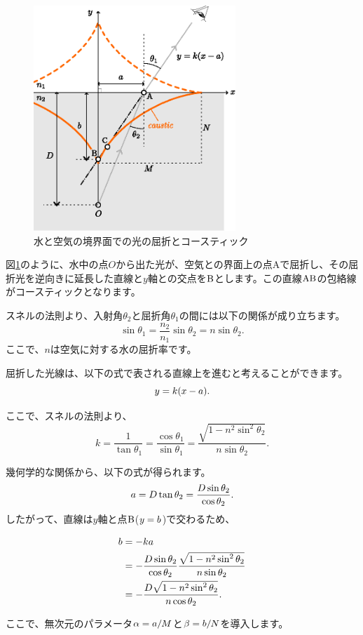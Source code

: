 \documentclass[twocolumn]{article}
\begin{document}
	\begin{figure}[ht]
		\centering
		\includegraphics[width=3in]{figs/g237.eps}
		\caption{水と空気の境界面での光の屈折とコースティック}
		\label{fig:geometry}
	\end{figure}
	
	図\ref{fig:geometry}のように、水中の点$O$から出た光が、空気との界面上の点Aで屈折し、その屈折光を逆向きに延長した直線と$y$軸との交点を${\mathrm{{B}}}$とします。この直線${\mathrm{{A}{B}}}$の包絡線がコースティックとなります。
	
	スネルの法則より、入射角$\theta_2$と屈折角$\theta_1$の間には以下の関係が成り立ちます。
	$$ \sin\theta_1 = \frac{n_2}{n_1} \sin\theta_2 = n\sin\theta_2.$$
	ここで、$n$は空気に対する水の屈折率です。
	
	屈折した光線は、以下の式で表される直線上を進むと考えることができます。
	$$y=k(x-{a}).$$
	
	ここで、スネルの法則より、
	$$k=\dfrac{1}{\tan\theta_1}=\dfrac{\cos\theta_1}{\sin\theta_1}
	=\dfrac{\sqrt{1-n^2\sin^2\theta_2}}{n\sin\theta_2}.$$
	
	幾何学的な関係から、以下の式が得られます。
	$${a} = D\tan\theta_2 = \dfrac{D\sin\theta_2}{\cos\theta_2}.$$
	したがって、直線は$y$軸と点$\mathrm{{B}}$($y={b}$)で交わるため、
	
	$$\begin{aligned}
		{b} &= -k{a} \\
		&= -\dfrac{D\sin\theta_2}{\cos\theta_2}
		\dfrac{\sqrt{1-n^2\sin^2\theta_2}}{n\sin\theta_2}\\
		&=-\dfrac{D\sqrt{1-n^2\sin^2\theta_2}}{n\cos\theta_2}.
	\end{aligned}$$
	
	ここで、無次元のパラメータ${\alpha}={a}/M$と${\beta}={b}/N$を導入します。
	
\end{document}
